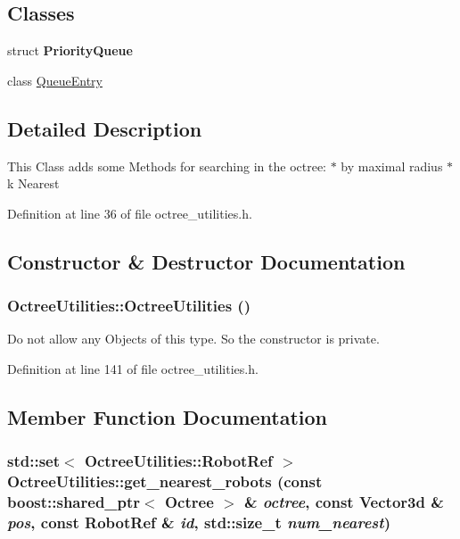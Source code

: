 \subsection*{Classes}
\begin{CompactItemize}
\item 
struct \textbf{PriorityQueue}
\item 
class \hyperlink{class_octree_utilities_1_1_queue_entry}{QueueEntry}
\end{CompactItemize}


\subsection{Detailed Description}
This Class adds some Methods for searching in the octree: $\ast$ by maximal radius $\ast$ k Nearest 

Definition at line 36 of file octree\_\-utilities.h.

\subsection{Constructor \& Destructor Documentation}
\hypertarget{class_octree_utilities_f202963d538bef3e5513d51dc118705d}{
\subsubsection[OctreeUtilities]{\setlength{\rightskip}{0pt plus 5cm}OctreeUtilities::OctreeUtilities ()}}
\label{class_octree_utilities_f202963d538bef3e5513d51dc118705d}


Do not allow any Objects of this type. So the constructor is private. 

Definition at line 141 of file octree\_\-utilities.h.

\subsection{Member Function Documentation}
\hypertarget{class_octree_utilities_5a89e609e139c6b82ad9d94579811d71}{
\subsubsection[get\_\-nearest\_\-robots]{\setlength{\rightskip}{0pt plus 5cm}std::set$<$ OctreeUtilities::RobotRef $>$ OctreeUtilities::get\_\-nearest\_\-robots (const boost::shared\_\-ptr$<$ {\bf Octree} $>$ \& {\em octree}, \/  const Vector3d \& {\em pos}, \/  const RobotRef \& {\em id}, \/  std::size\_\-t {\em num\_\-nearest})}}
\label{class_octree_utilities_5a89e609e139c6b82ad9d94579811d71}


